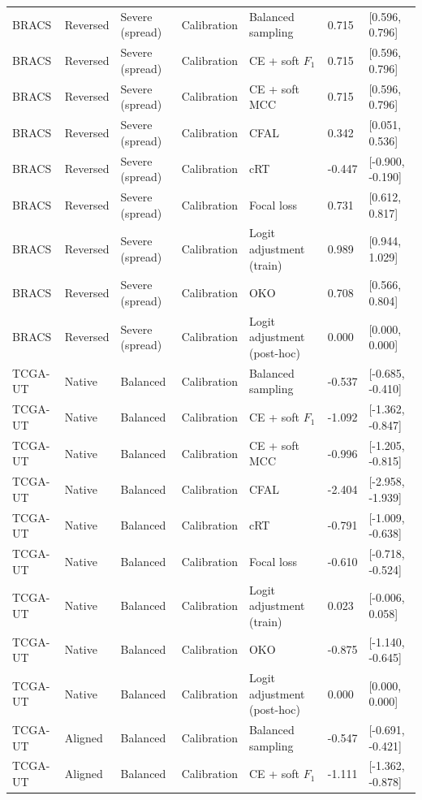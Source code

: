 \begin{longtable}{lllllll}
BRACS & Reversed & Severe (spread) & Calibration & Balanced sampling & 0.715 & [0.596, 0.796] \\
BRACS & Reversed & Severe (spread) & Calibration & CE + soft $F_1$ & 0.715 & [0.596, 0.796] \\
BRACS & Reversed & Severe (spread) & Calibration & CE + soft MCC & 0.715 & [0.596, 0.796] \\
BRACS & Reversed & Severe (spread) & Calibration & CFAL & 0.342 & [0.051, 0.536] \\
BRACS & Reversed & Severe (spread) & Calibration & cRT & -0.447 & [-0.900, -0.190] \\
BRACS & Reversed & Severe (spread) & Calibration & Focal loss & 0.731 & [0.612, 0.817] \\
BRACS & Reversed & Severe (spread) & Calibration & Logit adjustment (train) & 0.989 & [0.944, 1.029] \\
BRACS & Reversed & Severe (spread) & Calibration & OKO & 0.708 & [0.566, 0.804] \\
BRACS & Reversed & Severe (spread) & Calibration & Logit adjustment (post-hoc) & 0.000 & [0.000, 0.000] \\
TCGA-UT & Native & Balanced & Calibration & Balanced sampling & -0.537 & [-0.685, -0.410] \\
TCGA-UT & Native & Balanced & Calibration & CE + soft $F_1$ & -1.092 & [-1.362, -0.847] \\
TCGA-UT & Native & Balanced & Calibration & CE + soft MCC & -0.996 & [-1.205, -0.815] \\
TCGA-UT & Native & Balanced & Calibration & CFAL & -2.404 & [-2.958, -1.939] \\
TCGA-UT & Native & Balanced & Calibration & cRT & -0.791 & [-1.009, -0.638] \\
TCGA-UT & Native & Balanced & Calibration & Focal loss & -0.610 & [-0.718, -0.524] \\
TCGA-UT & Native & Balanced & Calibration & Logit adjustment (train) & 0.023 & [-0.006, 0.058] \\
TCGA-UT & Native & Balanced & Calibration & OKO & -0.875 & [-1.140, -0.645] \\
TCGA-UT & Native & Balanced & Calibration & Logit adjustment (post-hoc) & 0.000 & [0.000, 0.000] \\
TCGA-UT & Aligned & Balanced & Calibration & Balanced sampling & -0.547 & [-0.691, -0.421] \\
TCGA-UT & Aligned & Balanced & Calibration & CE + soft $F_1$ & -1.111 & [-1.362, -0.878] \\

\end{longtable}
